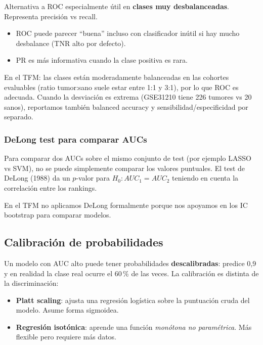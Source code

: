 \documentclass[11pt, a4paper]{article}
\begin{document}
Alternativa a ROC especialmente \'util en \textbf{clases muy
desbalanceadas}. Representa precisi\'on vs recall.

\begin{itemize}[leftmargin=1.2em]
  \item ROC puede parecer ``buena'' incluso con clasificador in\'util si
  hay mucho desbalance (TNR alto por defecto).
  \item PR es m\'as informativa cuando la clase positiva es rara.
\end{itemize}

En el TFM: las clases est\'an moderadamente balanceadas en las cohortes
evaluables (ratio tumor:sano suele estar entre 1:1 y 3:1), por lo que
ROC es adecuada. Cuando la desviaci\'on es extrema (GSE31210 tiene
226 tumores vs 20 sanos), reportamos tambi\'en balanced accuracy y
sensibilidad/especificidad por separado.

\subsubsection*{DeLong test para comparar AUCs}

Para comparar dos AUCs sobre el mismo conjunto de test (por ejemplo LASSO
vs SVM), no se puede simplemente comparar los valores puntuales. El test
de DeLong (1988) da un $p$-valor para $H_0: AUC_1 = AUC_2$ teniendo en
cuenta la correlaci\'on entre los rankings.

En el TFM no aplicamos DeLong formalmente porque nos apoyamos en los
IC bootstrap para comparar modelos.

\subsection{Calibraci\'on de probabilidades}

Un modelo con AUC alto puede tener probabilidades \textbf{descalibradas}:
predice 0,9 y en realidad la clase real ocurre el 60\,\% de las veces.
La calibraci\'on es distinta de la discriminaci\'on:

\begin{itemize}[leftmargin=1.2em]
  \item \textbf{Platt scaling}: ajusta una regresi\'on log\'istica sobre
  la puntuaci\'on cruda del modelo. Asume forma sigmoidea.
  \item \textbf{Regresi\'on isot\'onica}: aprende una funci\'on
  \emph{mon\'otona no param\'etrica}. M\'as flexible pero requiere m\'as
  datos.
\end{itemize}
\end{document}
